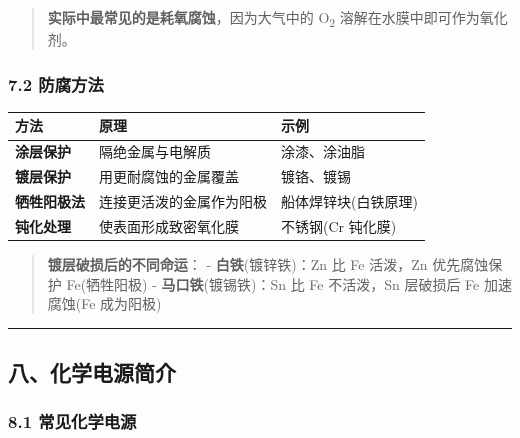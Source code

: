 \begin{quote}
\textbf{实际中最常见的是耗氧腐蚀}，因为大气中的 O\textsubscript{2} 溶解在水膜中即可作为氧化剂。
\end{quote}

\subsubsection{7.2 防腐方法}\label{ux9632ux8150ux65b9ux6cd5}

{\def\LTcaptype{none} %
\begin{longtable}[]{@{}lll@{}}
\toprule\noalign{}
方法 & 原理 & 示例 \\
\midrule\noalign{}
\endhead
\bottomrule\noalign{}
\endlastfoot
\textbf{涂层保护} & 隔绝金属与电解质 & 涂漆、涂油脂 \\
\textbf{镀层保护} & 用更耐腐蚀的金属覆盖 & 镀铬、镀锡 \\
\textbf{牺牲阳极法} & 连接更活泼的金属作为阳极 & 船体焊锌块(白铁原理) \\
\textbf{钝化处理} & 使表面形成致密氧化膜 & 不锈钢(Cr 钝化膜) \\
\end{longtable}
}

\begin{quote}
\textbf{镀层破损后的不同命运}：
- \textbf{白铁}(镀锌铁)：Zn 比 Fe 活泼，Zn 优先腐蚀保护 Fe(牺牲阳极)
- \textbf{马口铁}(镀锡铁)：Sn 比 Fe 不活泼，Sn 层破损后 Fe 加速腐蚀(Fe 成为阳极)
\end{quote}

\begin{center}\rule{0.5\linewidth}{0.5pt}\end{center}

\subsection{八、化学电源简介}\label{ux516bux5316ux5b66ux7535ux6e90ux7b80ux4ecb}

\subsubsection{8.1 常见化学电源}\label{ux5e38ux89c1ux5316ux5b66ux7535ux6e90}

